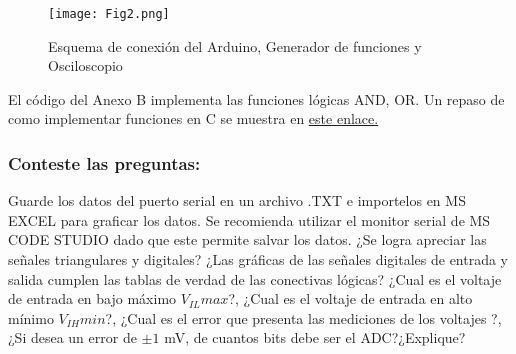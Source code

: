 \begin{figure}[H]
	\centering
	\texttt{[image: Fig2.png]}
	\caption{Esquema de conexión del Arduino, Generador de funciones y Osciloscopio}
	\label{fig:fig2}
\end{figure}


El código del Anexo B implementa las funciones lógicas AND, OR. Un repaso de como implementar funciones en C se muestra en \href{https://aprendiendoarduino.wordpress.com/2016/11/16/funciones-definidas-por-usuario-2/}{este enlace.} 

\subsubsection{Conteste las preguntas:}

Guarde los datos del puerto serial en un archivo .TXT e importelos en MS EXCEL para graficar los datos.
Se recomienda utilizar el monitor serial de MS CODE STUDIO dado que este permite salvar los datos.
¿Se logra apreciar las señales triangulares y digitales?
¿Las gráficas de las señales digitales de entrada y salida cumplen las tablas de verdad de las conectivas lógicas?
¿Cual es el voltaje de entrada en bajo máximo $V_{IL} max$?,
¿Cual es el voltaje de entrada en alto mínimo $V_{IH} min$?,
¿Cual es el error que presenta las mediciones de los voltajes ?,
¿Si desea un error de $\pm1$ mV, de cuantos bits debe ser el ADC?¿Explique?